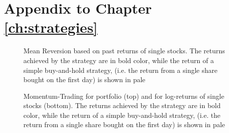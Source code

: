 


\section{Appendix to Chapter \ref{ch:strategies}}

\begin{figure}[h!]
    \centering
    \begin{adjustbox}{width=.95\textwidth,center, scale={1}{0.8}}
        
    \end{adjustbox}  
    \caption{Mean Reversion based on past returns of single stocks. The returns achieved by the strategy are in bold color, while the return of a simple buy-and-hold strategy, (i.e. the return from a single share bought on the first day) is shown in pale}
    \label{fig:mean_reversion_returns}
\end{figure}

\begin{figure}[h!]
    \centering
    \begin{adjustbox}{width=.95\textwidth,center}
        
    \end{adjustbox}  
    \begin{adjustbox}{width=.95\textwidth,center}
        
    \end{adjustbox}      
    \caption{Momentum-Trading for portfolio (top) and for log-returns of single stocks (bottom). The returns achieved by the strategy are in bold color, while the return of a simple buy-and-hold strategy, (i.e. the return from a single share bought on the first day) is shown in pale}
    \label{fig:momentum-trading}
\end{figure}




